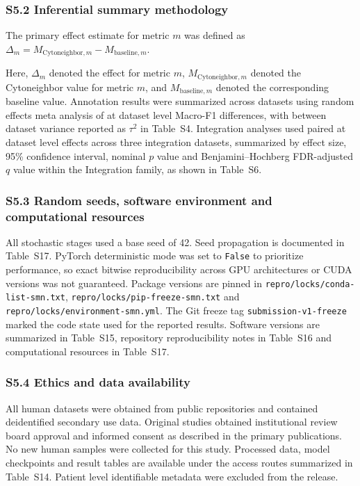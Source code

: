 \documentclass[11pt]{article}
\begin{document}
\subsubsection*{S5.2 Inferential summary methodology}

The primary effect estimate for metric \(m\) was defined as \(\Delta_m = M_{\mathrm{Cytoneighbor},m} - M_{\mathrm{baseline},m}\).

Here, \(\Delta_m\) denoted the effect for metric \(m\), \(M_{\mathrm{Cytoneighbor},m}\) denoted the Cytoneighbor value for metric \(m\), and \(M_{\mathrm{baseline},m}\) denoted the corresponding baseline value. Annotation results were summarized across datasets using random effects meta analysis of at dataset level Macro-F1 differences, with between dataset variance reported as \(\tau^2\) in Table~S4. Integration analyses used paired at dataset level effects across three integration datasets, summarized by effect size, 95\% confidence interval, nominal \(p\) value and Benjamini--Hochberg FDR-adjusted \(q\) value within the Integration family, as shown in Table~S6.

\subsubsection*{S5.3 Random seeds, software environment and computational resources}

All stochastic stages used a base seed of 42. Seed propagation is documented in Table~S17. PyTorch deterministic mode was set to \texttt{False} to prioritize performance, so exact bitwise reproducibility across GPU architectures or CUDA versions was not guaranteed. Package versions are pinned in \texttt{repro/locks/conda-list-smn.txt}, \texttt{repro/locks/pip-freeze-smn.txt} and \texttt{repro/locks/environment-smn.yml}. The Git freeze tag \texttt{submission-v1-freeze} marked the code state used for the reported results. Software versions are summarized in Table~S15, repository reproducibility notes in Table~S16 and computational resources in Table~S17.

\subsubsection*{S5.4 Ethics and data availability}

All human datasets were obtained from public repositories and contained deidentified secondary use data. Original studies obtained institutional review board approval and informed consent as described in the primary publications. No new human samples were collected for this study. Processed data, model checkpoints and result tables are available under the access routes summarized in Table~S14. Patient level identifiable metadata were excluded from the release.
\end{document}
